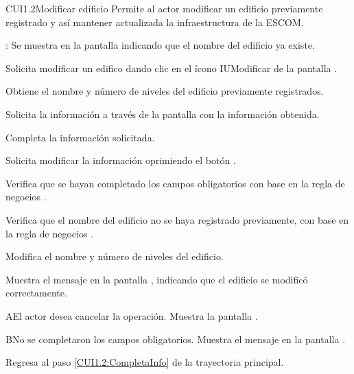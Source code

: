 \begin{UseCase}{CUI1.2}{Modificar edificio}{	
	Permite al actor modificar un edificio previamente registrado y así mantener actualizada la infraestructura de la ESCOM.
}
{\begin{UClist}
			\UCli {}: Se muestra en la pantalla  indicando que el nombre del edificio ya existe.
		\end{UClist}
	}
\end{UseCase}

\begin{UCtrayectoria}
	\UCpaso [\UCactor] Solicita modificar un edifico dando clic en el ícono IUModificar de la pantalla . 
	
	\UCpaso [\UCsist] Obtiene el nombre y número de niveles del edificio previamente registrados.
	
	\UCpaso [\UCsist] Solicita la información a través de la pantalla  con la información obtenida.
	
	\UCpaso [\UCactor] Completa la información solicitada. \label{CUI1.2:CompletaInfo}
	
	\UCpaso [\UCactor] Solicita modificar la información oprimiendo el botón . 
	
	\UCpaso [\UCsist] Verifica que se hayan completado los campos obligatorios con base en la regla de negocios . 
	
	\UCpaso [\UCsist] Verifica que el nombre del edificio no se haya registrado previamente, con base en la regla de negocios . 
	
	\UCpaso [\UCsist] Modifica el nombre y número de niveles del edificio.
	
	\UCpaso [\UCsist] Muestra el mensaje  en la pantalla , indicando que el edificio se modificó correctamente.	
	
\end{UCtrayectoria}

\begin{UCtrayectoriaA}{A}{El actor desea cancelar la operación.}
	\UCpaso [\UCsist] Muestra la pantalla . 
\end{UCtrayectoriaA}

\begin{UCtrayectoriaA}{B}{No se completaron los campos obligatorios.}
	\UCpaso [\UCsist] Muestra el mensaje  en la pantalla .
	
	\UCpaso Regresa al paso \ref{CUI1.2:CompletaInfo} de la trayectoria principal.
\end{UCtrayectoriaA}

